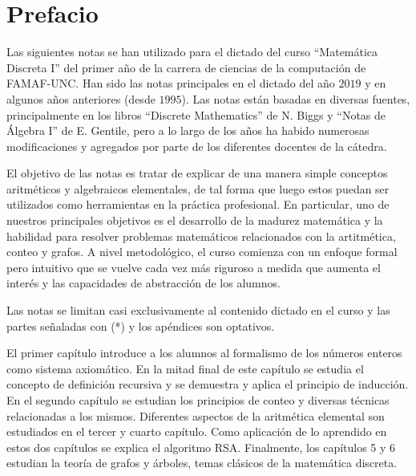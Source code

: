 \documentclass[a4paper,12pt,twoside,spanish,reqno,dottedtoc]{scrbook}
\begin{document}
    
    \chapter*{Prefacio} 
    
    
    Las siguientes notas se han utilizado para el dictado del curso  “Matemática Discreta I” del primer año de la carrera de ciencias de la computación de FAMAF-UNC. Han sido las notas principales en el dictado del año $2019$ y en algunos años anteriores (desde $1995$).  Las notas están basadas en diversas fuentes, principalmente en los libros “Discrete Mathematics” de N. Biggs y “Notas de Álgebra I” de E. Gentile, pero a lo largo de los años ha habido numerosas modificaciones y agregados por parte de los diferentes docentes de la cátedra. 
    
    El objetivo de las notas es tratar de explicar de una manera simple conceptos aritméticos y algebraicos  elementales, de tal forma que luego estos puedan ser utilizados como herramientas en la práctica profesional. En particular, uno de nuestros principales objetivos es el desarrollo de la madurez matemática y la habilidad para resolver problemas matemáticos relacionados con la artitmética,  conteo  y grafos. A nivel metodológico, el curso comienza con un enfoque formal pero intuitivo que se vuelve cada vez más riguroso a medida que aumenta el interés y las capacidades de abstracción de los alumnos. 
    
    
    
    Las notas se limitan casi exclusivamente al contenido dictado en el curso y las partes señaladas con (*) y los apéndices son optativos. 
    
    El  primer capítulo introduce a los alumnos al formalismo de los números enteros como sistema axiomático. En la  mitad final de este capítulo se estudia el concepto de definición recursiva y se demuestra y aplica el principio de inducción.  En el segundo capítulo se estudian los principios de conteo  y diversas técnicas relacionadas a los mismos. Diferentes aspectos de la aritmética elemental son estudiados en el tercer y cuarto capítulo. Como aplicación de lo  aprendido en  estos dos capítulos se explica el algoritmo RSA. Finalmente, los capítulos 5 y 6 estudian la teoría de grafos y árboles, temas clásicos de la matemática discreta. 
    
    
    
    \setcounter{chapter}{0}
\cleardoublepage
\end{document}
